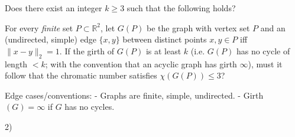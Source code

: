 Does there exist an integer $k\ge 3$ such that the following holds?

For every \emph{finite} set $P\subset \mathbb{R}^2$, let $G(P)$ be the graph with vertex set $P$ and an (undirected, simple) edge $\{x,y\}$ between distinct points $x,y\in P$ iff $\|x-y\|_2=1$.
If the girth of $G(P)$ is at least $k$ (i.e. $G(P)$ has no cycle of length $<k$; with the convention that an acyclic graph has girth $\infty$), must it follow that the chromatic number satisfies $\chi(G(P))\le 3$?

Edge cases/conventions:
- Graphs are finite, simple, undirected.
- Girth$(G)=\infty$ if $G$ has no cycles.

2)
